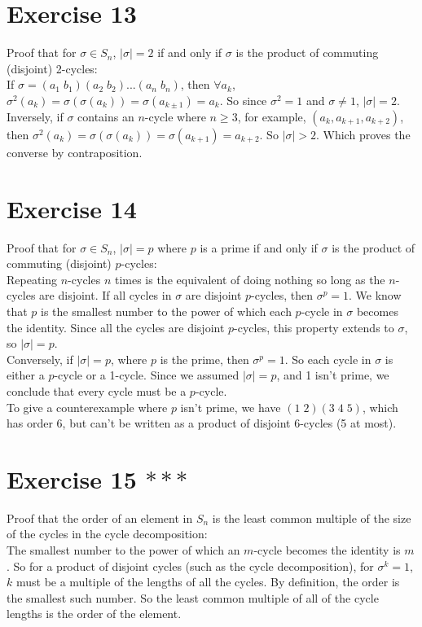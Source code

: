 \documentclass[12pt]{article}
\begin{document}
    \section*{Exercise 13}
    Proof that for $\sigma \in S_n$, $|\sigma| = 2$
    if and only if $\sigma$ is the product of commuting (disjoint) 2-cycles: \\
    If $\sigma = (a_1\;b_1)(a_2\;b_2)...(a_n\;b_n)$,
    then $\forall a_k$,
    $\sigma^2(a_k) = \sigma(\sigma(a_k)) = \sigma(a_{k \pm 1}) = a_k$.
    So since $\sigma^2 = 1$ and $\sigma \neq 1$,
    $|\sigma| = 2$. \\
    Inversely, if $\sigma$ contains an $n$-cycle where $n \geqslant 3$,
    for example, $(a_k, a_{k+1}, a_{k+2})$,
    then $\sigma^2(a_k) = \sigma(\sigma(a_k)) = \sigma(a_{k+1}) = a_{k+2}$.
    So $|\sigma| > 2$.
    Which proves the converse by contraposition. 


    \section*{Exercise 14}
    Proof that for $\sigma \in S_n$, $|\sigma| = p$ where $p$ is a prime
    if and only if $\sigma$ is the product of commuting (disjoint)
    $p$-cycles: \\
    Repeating $n$-cycles $n$ times is the equivalent of doing nothing
    so long as the $n$-cycles are disjoint.
    If all cycles in $\sigma$ are disjoint $p$-cycles,
    then $\sigma^p = 1$.
    We know that $p$ is the smallest number to the power of which each
    $p$-cycle in $\sigma$ becomes the identity. 
    Since all the cycles are disjoint $p$-cycles,
    this property extends to $\sigma$,
    so $|\sigma| = p$. \\
    Conversely, if $|\sigma| = p$, where $p$ is the prime,
    then $\sigma^p = 1$.
    So each cycle in $\sigma$ is either a $p$-cycle or a 1-cycle.
    Since we assumed $|\sigma| = p$, and 1 isn't prime,
    we conclude that every cycle must be a $p$-cycle. \\
    To give a counterexample where $p$ isn't prime,
    we have $(1\;2)(3\;4\;5)$, which has order 6,
    but can't be written as a product of disjoint $6$-cycles (5 at most).


    \section*{Exercise 15 $***$}
    Proof that the order of an element in $S_n$ is the least common multiple
    of the size of the cycles in the cycle decomposition: \\
    The smallest number to the power of which an $m$-cycle becomes the 
    identity is $m$.
    So for a product of disjoint cycles (such as the cycle decomposition),
    for $\sigma^k = 1$, $k$ must be a multiple of the lengths of all the
    cycles. 
    By definition, the order is the smallest such number.
    So the least common multiple of all of the cycle lengths is the order of
    the element. 
    
\end{document}

